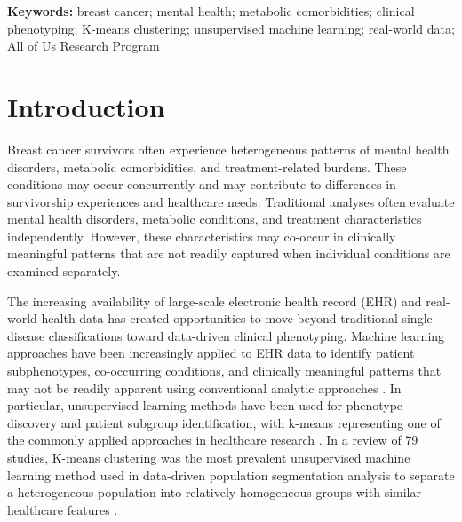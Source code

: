 \documentclass[11pt]{article}
\begin{document}
\begin{abstract}
\textbf{Conclusions:} Unsupervised K-means clustering identified four distinct
multidimensional phenotypic profiles among female breast cancer patients.
The profiles highlight substantial heterogeneity in the intersection of
psychiatric morbidity, metabolic comorbidity, and cancer treatment exposure.
These data-driven phenotypes may provide a useful framework for exploratory
patient segmentation and survivorship research. Future studies should assess
cluster stability using alternative methods designed for binary data and
evaluate whether the identified phenotypes are associated with longitudinal
clinical outcomes, healthcare utilization, recurrence, or mortality.

\end{abstract}

\noindent\textbf{Keywords:} breast cancer; mental health; metabolic
comorbidities; clinical phenotyping; K-means clustering; unsupervised machine
learning; real-world data; All of Us Research Program
\section{Introduction}


Breast cancer survivors often experience heterogeneous patterns of mental health disorders, metabolic comorbidities, and treatment-related burdens. These conditions may occur concurrently and may contribute to differences in survivorship experiences and healthcare needs. Traditional analyses often evaluate mental health disorders, metabolic conditions, and treatment characteristics independently. However, these characteristics may co-occur in clinically meaningful patterns that are not readily captured when individual conditions are examined separately.

The increasing availability of large-scale electronic health record (EHR) and real-world health data has created opportunities to move beyond traditional single-disease classifications toward data-driven clinical phenotyping. Machine learning approaches have been increasingly applied to EHR data to identify patient subphenotypes, co-occurring conditions, and clinically meaningful patterns that may not be readily apparent using conventional analytic approaches \cite{yang2023}. In particular, unsupervised learning methods have been used for phenotype discovery and patient subgroup identification, with k-means representing one of the commonly applied approaches in healthcare research \cite{yang2023}. In a review of 79 studies, K-means clustering was the most prevalent unsupervised machine learning method used in data-driven population segmentation analysis to separate a heterogeneous population into relatively homogeneous groups with similar healthcare features \cite{Liu2023}.
\end{document}
